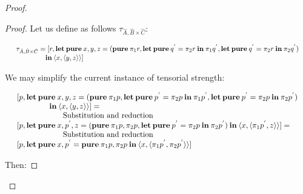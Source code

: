 \documentclass[a4paper]{article}
\begin{document}
\begin{proof}
\begin{proof}
\vspace{\baselineskip}

Let us define as follows $\tau_{\hat{A}, \hat{B} \times \hat{C}}$:

$\begin{array}{lll}
&\tau_{\hat{A}, \hat{B} \times \hat{C}} = [r, {\bf let \: pure \:} x, y, z = ({\bf pure \:} \pi_1 r, {\bf let \: pure \:} q^{'} = \pi_2 r {\: \bf in \:} \pi_1 q^{'}, {\bf let \: pure \:} q^{'} = \pi_2 r {\: \bf in \:} \pi_2 q^{'}) & \\
&\quad\quad\quad\quad {\: \bf in \:} \langle x, \langle y, z \rangle\rangle]& \\
\end{array}$

\vspace{\baselineskip}

We may simplify the current instance of tensorial strength:

$\begin{array}{lll}
&[p, {\bf let \: pure \:} x, y, z = ({\bf pure \:} \pi_1 p, {\bf let \: pure \:} p^{'} = \pi_2 p {\: \bf in \:} \pi_1 p^{'}, {\bf let \: pure \:} p^{'} = \pi_2 p {\: \bf in \:} \pi_2 p^{'}) & \\
&\quad\quad\quad\quad {\: \bf in \:} \langle x, \langle y, z \rangle\rangle] = & \\
&\quad\quad\quad\quad\quad\quad \text{Substitution and reduction}& \\
&[p, {\bf let \: pure \:} x, p^{'}, z = ({\bf pure \:} \pi_1 p, \pi_2 p, {\bf let \: pure \:} p^{'} = \pi_2 p {\: \bf in \:} \pi_2 p^{'}) {\: \bf in \:} \langle x, \langle \pi_1 p^{'}, z \rangle\rangle] = & \\
&\quad\quad\quad\quad\quad\quad \text{Substitution and reduction}& \\
&[p, {\bf let \: pure \:} x, p^{'} = {\bf pure \:} \pi_1 p, \pi_2 p {\: \bf in \:} \langle x, \langle \pi_1 p^{'}, \pi_2 p^{'} \rangle\rangle]&
\end{array}$

\vspace{\baselineskip}

Then:

\vspace{\baselineskip}


\end{proof}
\end{proof}
\end{document}
